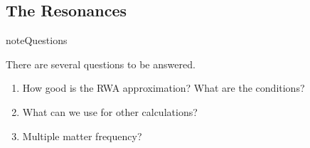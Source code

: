 \documentclass[letterpaper,12pt,english]{sphinxmanual}
\begin{document}
\subsection{The Resonances}
\label{\detokenize{matter-stimulated/single-frequency:the-resonances}}
\begin{sphinxadmonition}{note}{Questions}

There are several questions to be answered.
\begin{enumerate}
\item {} 
How good is the RWA approximation? What are the conditions?

\item {} 
What can we use for other calculations?

\item {} 
Multiple matter frequency?

\end{enumerate}
\end{sphinxadmonition}
\end{document}
